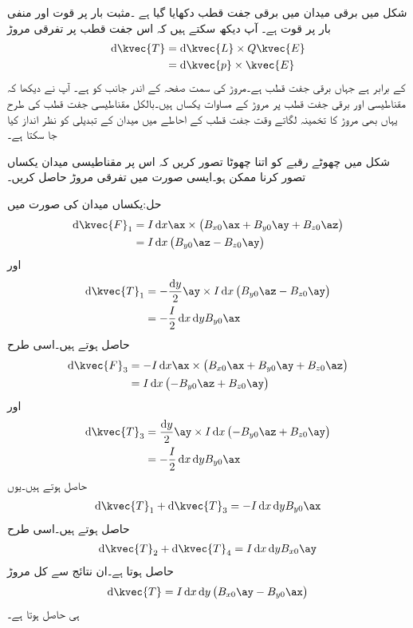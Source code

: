 شکل  میں برقی میدان میں برقی جفت قطب دکھایا گیا ہے ۔مثبت بار پر قوت  اور منفی بار پر قوت    ہے۔ آپ دیکھ سکتے ہیں کہ اس جفت قطب پر  تفرقی مروڑ
\begin{align*}
\dif \kvec{T}&=\dif \kvec{L} \times Q \kvec{E}\\
&=\dif \kvec{p} \times \kvec{E}
\end{align*}
کے برابر ہے جہاں  برقی جفت قطب ہے۔مروڑ کی سمت صفحہ کے اندر جانب کو ہے۔ آپ نے دیکھا کہ مقناطیسی اور برقی جفت قطب پر مروڑ کے مساوات یکساں ہیں۔بالکل مقناطیسی جفت قطب کی طرح یہاں بھی مروڑ کا تخمینہ لگاتے وقت جفت قطب کے احاطے میں میدان  کے تبدیلی کو نظر انداز کیا جا سکتا ہے۔

شکل  میں چھوٹے رقبے کو اتنا چھوٹا تصور کریں کہ اس پر مقناطیسی میدان یکساں تصور کرنا ممکن ہو۔ایسی صورت میں تفرقی مروڑ حاصل کریں۔

حل:یکساں میدان کی صورت میں
\begin{align*}
\dif \kvec{F}_1&=I \dif x \ax \times \left(B_{x0} \ax+B_{y0}\ay+B_{z0}\az\right)\\
&=I \dif x \left(B_{y0}\az-B_{z0}\ay \right)
\end{align*}
اور
\begin{align*}
\dif \kvec{T}_1&=-\frac{\dif y}{2}\ay \times I \dif x \left(B_{y0}\az-B_{z0}\ay \right)\\
&=-\frac{I}{2} \dif x \dif y B_{y0}\ax
\end{align*}
حاصل ہوتے ہیں۔اسی طرح
\begin{align*}
\dif \kvec{F}_3&=-I \dif x \ax \times \left(B_{x0} \ax+B_{y0}\ay+B_{z0}\az\right)\\
&=I \dif x \left(-B_{y0}\az+B_{z0}\ay \right)
\end{align*}
اور
\begin{align*}
\dif \kvec{T}_3&=\frac{\dif y}{2}\ay \times I \dif x \left(-B_{y0}\az+B_{z0}\ay \right)\\
&=-\frac{I}{2} \dif x \dif y B_{y0}\ax
\end{align*}
حاصل ہوتے ہیں۔یوں
\begin{align*}
\dif \kvec{T}_1+\dif \kvec{T}_3=-I \dif x \dif y B_{y0}\ax
\end{align*}
حاصل ہوتے ہیں۔اسی طرح
\begin{align*}
\dif \kvec{T}_2+\dif \kvec{T}_4=I\dif x \dif y  B_{x0}\ay
\end{align*}
حاصل ہوتا ہے۔ان نتائج سے کل مروڑ
\begin{align*}
\dif \kvec{T}=I \dif x \dif y  \left(B_{x0}\ay -B_{y0}\ax\right) 
\end{align*}
ہی حاصل ہوتا ہے۔

